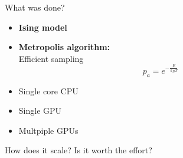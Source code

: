 \documentclass{beamer}
\begin{document}
\begin{frame}{What was done?}
    \begin{minipage}{0.5\paperwidth}
        \begin{itemize}
            \item \textbf{Ising model}
                \noindent \ising
            \item \textbf{Metropolis algorithm:}\\
                Efficient sampling
                \begin{equation*}
                    p_a = e^{-\frac{E}{k_B T}}
                \end{equation*}
        \end{itemize}
    \end{minipage} \pause
    \hfill
    \begin{minipage}[c]{0.3\paperwidth}
        \begin{itemize}%
            \item Single core CPU \pause
            \item Single GPU \pause
            \item Multpiple GPUs \pause
        \end{itemize}
    \end{minipage}
\begin{mybox}
    How does it scale? Is it worth the effort?
\end{mybox}
\end{frame}
\end{document}
